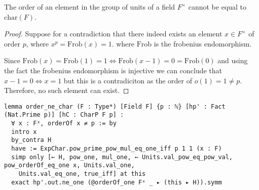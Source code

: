 \begin{lemma}
  \label{order_ne_char}
  \leanok
  The order of an element in the group of units of a field $F^\times$ cannot be equal to $\textrm{char}(F)$.
\end{lemma}
\begin{proof}
\leanok
Suppose for a contradiction that there indeed exists an element $x \in F^\times$ of order $p$, where $x^p = \textrm{Frob}(x) = 1$. where $\textrm{Frob}$
is the frobenius endomorphism.

Since $\textrm{Frob}(x) = \textrm{Frob}(1) = 1 \iff \textrm{Frob}(x - 1) = 0 = \textrm{Frob}(0)$ and using the fact the frobenius endomorphism is injective
we can conclude that $x - 1 = 0 \iff x = 1$ but this is a contradiciton as the order of $o(1) = 1 \ne p$. Therefore, no such element can exist.
\end{proof}
\begin{footnotesize}
\begin{verbatim}
lemma order_ne_char (F : Type*) [Field F] {p : ℕ} [hp' : Fact (Nat.Prime p)] [hC : CharP F p] :
  ∀ x : Fˣ, orderOf x ≠ p := by
  intro x
  by_contra H
  have := ExpChar.pow_prime_pow_mul_eq_one_iff p 1 1 (x : F)
  simp only [← H, pow_one, mul_one, ← Units.val_pow_eq_pow_val, pow_orderOf_eq_one x, Units.val_one,
    Units.val_eq_one, true_iff] at this
  exact hp'.out.ne_one (@orderOf_one Fˣ _ ▸ (this ▸ H)).symm
\end{verbatim}
\end{footnotesize}

